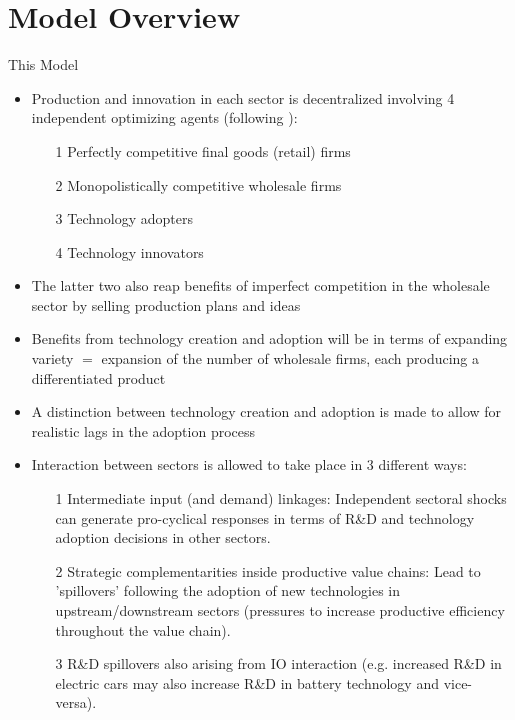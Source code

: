 \documentclass[compress,xcolor=dvipsnames]{beamer}
\newenvironment{noheadline}{
    \setbeamertemplate{headline}{}
    \addtobeamertemplate{frametitle}{\vspace*{-0.9\baselineskip}}{}
}{}
\begin{document}
\section{Model Overview}

\begin{noheadline}
\begin{frame}{This Model}
\begin{itemize}
\item Production and innovation in each sector is decentralized involving 4 independent optimizing agents (following \citet{Anzoategui2017}): \vspace{3mm}
\begin{itemize} \setlength{\itemsep}{0.2em}
\item[1] Perfectly competitive final goods (retail) firms 
\item[2] Monopolistically competitive wholesale firms 
\item[3] Technology adopters
\item[4] Technology innovators
\end{itemize}
\item The latter two also reap benefits of imperfect competition in the wholesale sector by selling production plans and ideas
\item Benefits from technology creation and adoption will be in terms of expanding variety $=$ expansion of the number of wholesale firms, each producing a differentiated product 
\end{itemize}
\end{frame}
\end{noheadline}

\begin{frame}
\begin{itemize}
\item A distinction between technology creation and adoption is made to allow for realistic lags in the adoption process
\item Interaction between sectors is allowed to take place in 3 different ways: \vspace{3mm}
\begin{itemize} \setlength{\itemsep}{0.8em} \small
\item[1] Intermediate input (and demand) linkages: Independent
sectoral shocks can generate pro-cyclical responses in terms of R\&D and technology adoption decisions in other sectors.
\item[2] Strategic complementarities inside productive value chains: Lead to 'spillovers' following the adoption of new technologies in upstream/downstream sectors (pressures to increase productive efficiency throughout the value chain). 
\item[3] R\&D spillovers also arising from IO interaction (e.g. increased R\&D in electric cars may also increase R\&D in battery technology and vice-versa). 
\end{itemize} 
\end{itemize}
\end{frame}
\end{document}
